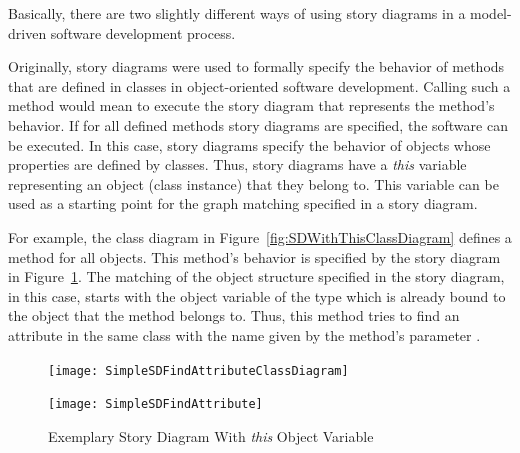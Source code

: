 
Basically, there are two slightly different ways of using story diagrams in a model-driven software development process.

Originally, story diagrams were used to formally specify the behavior of methods that are defined in classes in object-oriented software development.
Calling such a method would mean to execute the story diagram that represents the method's behavior.
If for all defined methods story diagrams are specified, the software can be executed.
In this case, story diagrams specify the behavior of objects whose properties are defined by classes.
Thus, story diagrams have a \emph{this} variable representing an object (class instance) that they belong to.
This variable can be used as a starting point for the graph matching specified in a story diagram.

For example, the class diagram in Figure~\ref{fig:SDWithThisClassDiagram} defines a method  for all  objects.
This method's behavior is specified by the story diagram in Figure~\ref{fig:SDWithThis}.
The matching of the object structure specified in the story diagram, in this case,
starts with the  object variable of the type  which is already bound
to the  object that the  method belongs to.
Thus, this method tries to find an attribute  in the same class with the name given by the method's parameter .

\begin{figure}[htb]
	\centering
  \begin{minipage}[t]{.4\textwidth}
    \centering
    \texttt{[image: SimpleSDFindAttributeClassDiagram]} 
    \caption{Type Model for the Story Diagram in Figure~\ref{fig:SDWithThis}}
    \label{fig:SDWithThisClassDiagram}
  \end{minipage}%
  \hfill
  \begin{minipage}[t]{.55\textwidth}
    \centering
    \texttt{[image: SimpleSDFindAttribute]}
    \caption{Exemplary Story Diagram With \emph{this} Object Variable}
    \label{fig:SDWithThis}
  \end{minipage}
\end{figure}

